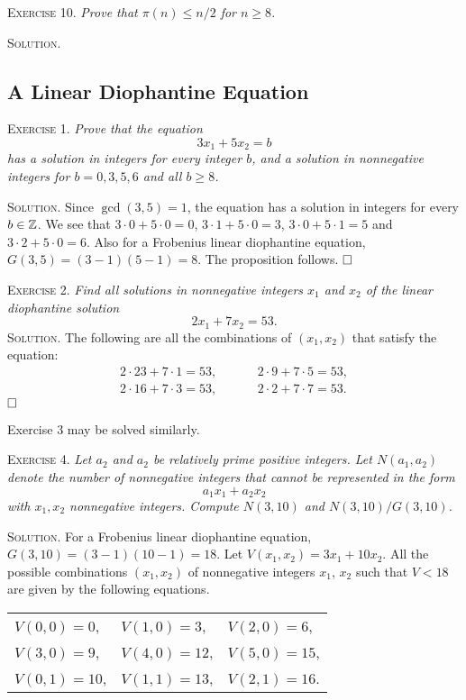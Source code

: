 \documentclass[11pt, leqno]{article}
\newcommand{\done}{\ensuremath{\hfill\square}}
\begin{document}
\textsc{Exercise 10}. \emph{Prove that $\pi(n) \leq n/2$ for $n\geq 8$.}

\textsc{Solution}.

\subsection{A Linear Diophantine Equation}

\textsc{Exercise 1}. \emph{Prove that the equation 
\begin{displaymath}
3x_1 + 5x_2 = b
\end{displaymath}
has a solution in integers for every integer $b$, and a solution in nonnegative integers for $b=0,3,5,6$ and all $b\geq 8$.}

\textsc{Solution}. Since $\gcd(3,5) = 1$, the equation has a solution in integers for every $b\in\mathbb{Z}$. We see that $3\cdot 0 + 5\cdot 0 = 0$, $3\cdot 1 + 5\cdot 0 = 3$, $3\cdot 0 + 5\cdot 1 = 5$ and $3\cdot 2 + 5\cdot 0 = 6$. Also for a Frobenius linear diophantine equation, $G(3,5) = (3-1)(5-1) = 8$. The proposition follows. \done

\textsc{Exercise 2}. \emph{Find all solutions in nonnegative integers $x_1$ and $x_2$ of the linear diophantine solution 
\begin{displaymath}
2x_1 + 7x_2 = 53.
\end{displaymath}}\textsc{Solution}. The following are all the combinations of $(x_1, x_2)$ that satisfy the equation: 
\begin{align*}
  2 \cdot 23 + 7 \cdot 1 = 53, \hspace{1cm} & 2 \cdot 9 + 7 \cdot 5 = 53,\\
  2 \cdot 16 + 7 \cdot 3 = 53, \hspace{1cm} & 2 \cdot 2 + 7 \cdot 7 = 53.
\end{align*}
\done

Exercise $3$ may be solved similarly.

\textsc{Exercise 4}. \emph{Let $a_2$ and $a_2$ be relatively prime positive integers. Let $N(a_1, a_2)$ denote the number of nonnegative integers that cannot be represented in the form 
\begin{displaymath}
a_1x_1 + a_2x_2
\end{displaymath}
with $x_1, x_2$ nonnegative integers. Compute $N(3,10)$ and $N(3,10)/G(3,10)$.}

\textsc{Solution}. For a Frobenius linear diophantine equation, $G(3,10) = (3-1)(10-1) = 18$. Let $V(x_1, x_2) = 3x_1 + 10x_2$. All the possible combinations $(x_1, x_2)$ of nonnegative integers $x_1$, $x_2$ such that $V<18$ are given by the following equations.
\begin{longtable}{p{6em} p{6em} p{6em}}
  $V(0, 0) = 0$, & $V(1,0) = 3$, & $V(2,0) = 6$, \\
  $V(3, 0) = 9$, & $V(4, 0) = 12$, & $V(5, 0) = 15$, \\
  $V(0, 1) = 10$, & $V(1, 1) = 13$, & $V(2, 1) = 16$.
\end{longtable}
\reduce
\end{document}

